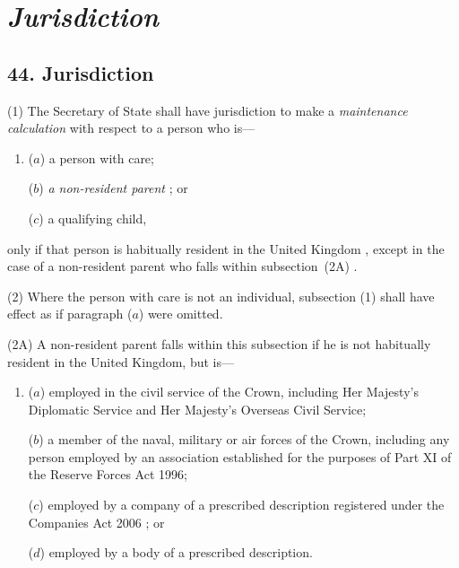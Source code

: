 \documentclass[12pt,a4paper]{article}
\begin{document}

\section{\itshape Jurisdiction}

\subsection{44. Jurisdiction}

(1) 
The 
Secretary of State  %
shall have jurisdiction to make a 
\emph{maintenance calculation}  %
with respect to a person who is—
\begin{enumerate}\item[]
($a$) a person with care;

($b$) 
\emph{a non-resident parent}%
; or

($c$) a qualifying child,
\end{enumerate}
only if that person is habitually resident in the United Kingdom%
, except in the case of a non-resident parent who falls within subsection~(2A)%
.

(2) Where the person with care is not an individual, subsection (1)  shall have effect as if paragraph ($a$)  were omitted.

(2A) A non-resident parent falls within this subsection if he is not habitually resident in the United Kingdom, but is—
\begin{enumerate}\item[]
\begin{sloppypar}
($a$) employed in the civil service of the Crown, including Her Majesty’s Diplomatic Service and Her Majesty’s Overseas Civil Service;
\end{sloppypar}

($b$) a member of the naval, military or air forces of the Crown, including any person employed by an association established for the purposes of Part XI of the Reserve Forces Act 1996;

($c$) employed by a company of a prescribed description 
registered under the Companies Act 2006%
; or

($d$) employed by a body of a prescribed description.
\end{enumerate}
\end{document}
